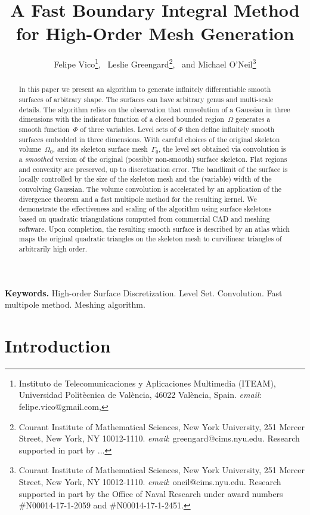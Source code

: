 \documentclass[11pt]{article}
\title{\bf{A Fast Boundary Integral Method
    for High-Order Mesh Generation}}
\author{Felipe Vico\thanks{Instituto de Telecomunicaciones y
    Aplicaciones Multimedia (ITEAM), 
    Universidad Polit\`ecnica
    de Val\`encia, 46022 Val\`encia, Spain.
    {\em email}: {\sf felipe.vico@gmail.com,}}, \,
Leslie Greengard\thanks{Courant Institute of Mathematical Sciences,
         New York University, 
         251 Mercer Street,
         New York, NY 10012-1110.
{\em email}: {\sf greengard@cims.nyu.edu}. Research supported in
    part by ... }, \, 
and Michael O'Neil\thanks{Courant Institute of Mathematical Sciences,
         New York University, 
         251 Mercer Street,
         New York, NY 10012-1110.
{\em email}: {\sf oneil@cims.nyu.edu}. Research supported in part by
  the Office of Naval Research under award numbers
    \#N00014-17-1-2059 and \#N00014-17-1-2451.}}
\date{}
\begin{document}
\maketitle




\begin{abstract}
  In this paper we present an algorithm to generate infinitely
  differentiable smooth surfaces of arbitrary shape. The surfaces can
  have arbitrary genus and multi-scale details.  The algorithm relies
  on the observation that convolution of a Gaussian in three
  dimensions with the indicator function of a closed bounded
  region~$\Omega$ generates a smooth function~$\Phi$ of three
  variables. Level sets of $\Phi$ then define infinitely smooth
  surfaces embedded in three dimensions.  With careful choices of the
  original skeleton volume~$\Omega_0$, and its skeleton surface
  mesh~$\Gamma_0$, the level set obtained via convolution is a
  \emph{smoothed} version of the original (possibly non-smooth)
  surface skeleton.  Flat regions and convexity are preserved, up to
  discretization error.  The bandlimit of the surface is locally
  controlled by the size of the skeleton mesh and the (variable) width
  of the convolving Gaussian.  The volume convolution is accelerated
  by an application of the divergence theorem and a fast multipole
  method for the resulting kernel.  We demonstrate the effectiveness
  and scaling of the algorithm using surface skeletons based on
  quadratic triangulations computed from commercial CAD and meshing
  software.  Upon completion, the resulting smooth surface is
  described by an atlas which maps the original quadratic triangles on
  the skeleton mesh to curvilinear triangles of arbitrarily high
  order.
\end{abstract}

{\bf Keywords.} High-order Surface Discretization.
Level Set. Convolution.
  Fast multipole method. Meshing algorithm.



\section{Introduction}
\end{document}
